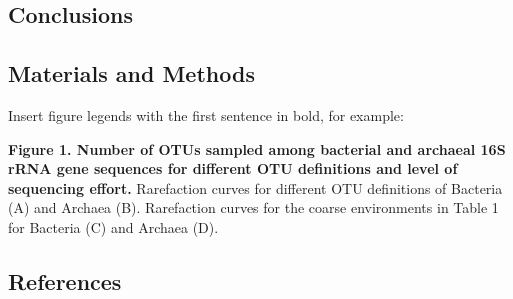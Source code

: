 \documentclass[11pt,]{article}
\begin{document}
\subsection{Conclusions}\label{conclusions}

\subsection{Materials and Methods}\label{materials-and-methods}

\newpage

Insert figure legends with the first sentence in bold, for example:

\textbf{Figure 1. Number of OTUs sampled among bacterial and archaeal
16S rRNA gene sequences for different OTU definitions and level of
sequencing effort.} Rarefaction curves for different OTU definitions of
Bacteria (A) and Archaea (B). Rarefaction curves for the coarse
environments in Table 1 for Bacteria (C) and Archaea (D).

\newpage

\subsection{References}\label{references}
\end{document}
